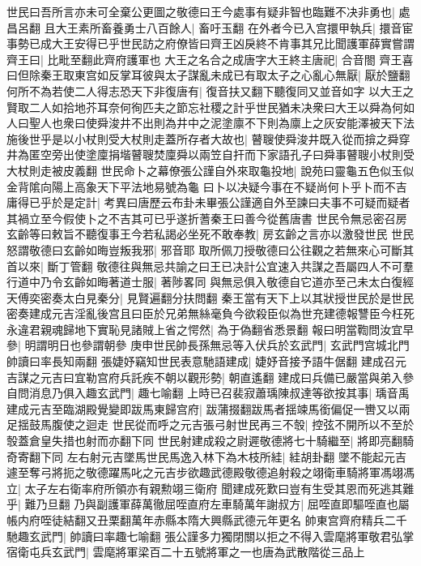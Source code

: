 世民曰吾所言亦未可全棄公更圖之敬德曰王今處事有疑非智也臨難不决非勇也|{
	處昌呂翻}
且大王素所畜養勇士八百餘人|{
	畜吁玉翻}
在外者今已入宫擐甲執兵|{
	擐音宦}
事勢已成大王安得已乎世民訪之府僚皆曰齊王凶戾終不肯事其兄比聞護軍薛實嘗謂齊王曰|{
	比毗至翻此齊府護軍也}
大王之名合之成唐字大王終主唐祀|{
	合音閤}
齊王喜曰但除秦王取東宫如反掌耳彼與太子謀亂未成已有取太子之心亂心無厭|{
	厭於鹽翻}
何所不為若使二人得志恐天下非復唐有|{
	復音扶又翻下聽復同又並音如字}
以大王之賢取二人如拾地芥耳奈何徇匹夫之節忘社稷之計乎世民猶未决衆曰大王以舜為何如人曰聖人也衆曰使舜浚井不出則為井中之泥塗廪不下則為廪上之灰安能澤被天下法施後世乎是以小杖則受大杖則走蓋所存者大故也|{
	瞽䏂使舜浚井既入從而揜之舜穿井為匿空旁出使塗廩捐堦瞽䏂焚廩舜以兩笠自扞而下家語孔子曰舜事瞽䏂小杖則受大杖則走被皮義翻}
世民命卜之幕僚張公謹自外來取龜投地|{
	說苑曰靈龜五色似玉似金背隂向陽上高象天下平法地易號為龜}
曰卜以决疑今事在不疑尚何卜乎卜而不吉庸得已乎於是定計|{
	考異曰唐歷云布卦未畢張公謹適自外至諫曰夫事不可疑而疑者其禍立至今假使卜之不吉其可已乎遂折蓍秦王曰善今從舊唐書}
世民令無忌密召房玄齡等曰敕旨不聽復事王今若私謁必坐死不敢奉教|{
	房玄齡之言亦以激發世民}
世民怒謂敬德曰玄齡如晦豈叛我邪|{
	邪音耶}
取所佩刀授敬德曰公往觀之若無來心可斷其首以來|{
	斷丁管翻}
敬德往與無忌共諭之曰王已决計公宜速入共謀之吾屬四人不可羣行道中乃令玄齡如晦著道士服|{
	著陟畧同}
與無忌俱入敬德自它道亦至己未太白復經天傅奕密奏太白見秦分|{
	見賢遍翻分扶問翻}
秦王當有天下上以其狀授世民於是世民密奏建成元吉淫亂後宫且曰臣於兄弟無絲毫負今欲殺臣似為世充建德報讐臣今枉死永違君親魂歸地下實恥見諸賊上省之愕然|{
	為于偽翻省悉景翻}
報曰明當鞫問汝宜早參|{
	明謂明日也參謂朝參}
庚申世民帥長孫無忌等入伏兵於玄武門|{
	玄武門宫城北門帥讀曰率長知兩翻}
張婕妤竊知世民表意馳語建成|{
	婕妤音接予語牛倨翻}
建成召元吉謀之元吉曰宜勒宫府兵託疾不朝以觀形勢|{
	朝直遙翻}
建成曰兵備已嚴當與弟入參自問消息乃俱入趣玄武門|{
	趣七喻翻}
上時已召裴寂蕭瑀陳叔達等欲按其事|{
	瑀音禹}
建成元吉至臨湖殿覺變即跋馬東歸宫府|{
	跋蒲掇翻跋馬者揺竦馬銜偏促一轡又以兩足揺鼓馬腹使之迴走}
世民從而呼之元吉張弓射世民再三不彀|{
	控弦不開所以不至於彀蓋倉皇失措也射而亦翻下同}
世民射建成殺之尉遲敬德將七十騎繼至|{
	將即亮翻騎奇寄翻下同}
左右射元吉墜馬世民馬逸入林下為木枝所絓|{
	絓胡卦翻}
墜不能起元吉遽至奪弓將扼之敬德躍馬叱之元吉步欲趣武德殿敬德追射殺之翊衛車騎將軍馮翊馮立|{
	太子左右衛率府所領亦有親勲翊三衛府}
聞建成死歎曰豈有生受其恩而死逃其難乎|{
	難乃旦翻}
乃與副護軍薛萬徹屈咥直府左車騎萬年謝叔方|{
	屈咥直即驅咥直也屬帳内府咥徒結翻又丑栗翻萬年赤縣本隋大興縣武德元年更名}
帥東宫齊府精兵二千馳趣玄武門|{
	帥讀曰率趣七喻翻}
張公謹多力獨閉關以拒之不得入雲麾將軍敬君弘掌宿衛屯兵玄武門|{
	雲麾將軍梁百二十五號將軍之一也唐為武散階從三品上}
